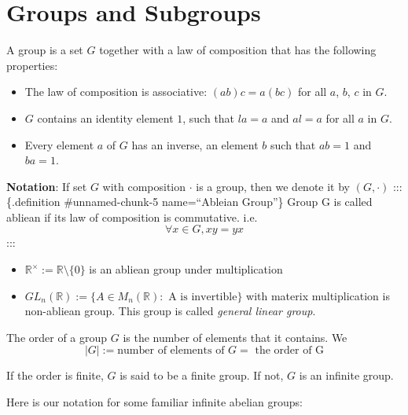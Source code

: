 \documentclass[
]{book}
\providecommand{\tightlist}{%
  \setlength{\itemsep}{0pt}\setlength{\parskip}{0pt}}
\begin{document}
\hypertarget{groups-and-subgroups}{%
\section{Groups and Subgroups}\label{groups-and-subgroups}}

\leavevmode{}%
A group is a set \(G\) together with a law of composition that has the
following properties:

\begin{itemize}
\tightlist
\item
  The law of composition is associative: \((ab)c = a(bc)\) for all
  \(a\), \(b\), \(c\) in \(G\).
\item
  \(G\) contains an identity element \(1\), such that \(la = a\) and
  \(al = a\) for all \(a\) in \(G\).
\item
  Every element \(a\) of \(G\) has an inverse, an element \(b\) such
  that \(ab = 1\) and \(ba = 1\).
\end{itemize}

\textbf{Notation}: If set \(G\) with composition \(\cdot\) is a group,
then we denote it by \((G,\cdot)\) ::: \{.definition \#unnamed-chunk-5
name=``Ableian Group''\} Group G is called abliean if its law of
composition is commutative. i.e. \[\forall x\in G, xy=yx\] :::

\hypertarget{unnamed-chunk-6}{}
\begin{itemize}
\tightlist
\item
  \(\mathbb{R}^\times:=\mathbb{R}\setminus \{0\}\) is an abliean group
  under multiplication
\item
  \(GL_n(\mathbb{R}):=\{A\in M_n(\mathbb{R}): \text{ A is invertible}\}\)
  with materix multiplication is non-abliean group. This group is called
  \emph{general linear group}.
\end{itemize}

\leavevmode{}%
The order of a group \(G\) is the number of elements that it contains.
We \[| G | := \text{number of elements of }G=\text{ the order of G}\]

If the order is finite, \(G\) is said to be a finite group. If not,
\(G\) is an infinite group.

Here is our notation for some familiar infinite abelian groups:
\end{document}
